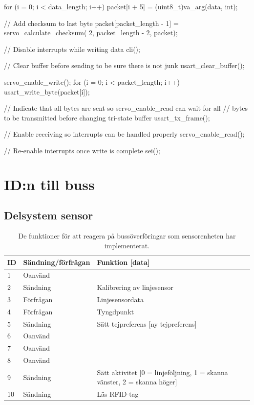 \begin{listing}{1}
{	for (i = 0; i < data_length; i++) {
		packet[i + 5] = (uint8_t)va_arg(data, int);
	}

	// Add checksum to last byte
	packet[packet_length - 1] = servo_calculate_checksum(
		2, packet_length - 2, packet);

	// Disable interrupts while writing data
	cli();

	// Clear buffer before sending to be sure there is not junk
	usart_clear_buffer();

	servo_enable_write();
	for (i = 0; i < packet_length; i++) {
		usart_write_byte(packet[i]);
	}

	// Indicate that all bytes are sent so servo_enable_read can
	wait for all
	// bytes to be transmitted before changing tri-state buffer
	usart_tx_frame();

	// Enable receiving so interrupts can be handled properly
	servo_enable_read();

	// Re-enable interrupts once write is complete
	sei();
}
\end{listing}

\section{ID:n till buss}
\label{sec:callbacks}
\subsection{Delsystem sensor}

\begin{table}[H]
\centering
\label{tab:callbacks-sensor}
\begin{tabularx}{\textwidth}{|l|l|X|}
\hline
\textbf{ID} & \textbf{Sändning/förfrågan} & \textbf{Funktion [data]} \\ \hline
1 & Oanvänd & \\ \hline
2 & Sändning & Kalibrering av linjesensor \\ \hline
3 & Förfrågan & Linjesensordata \\ \hline
4 & Förfrågan & Tyngdpunkt \\ \hline
5 & Sändning & Sätt tejpreferens [ny tejpreferens] \\ \hline
6 & Oanvänd & \\ \hline
7 & Oanvänd & \\ \hline
8 & Oanvänd & \\ \hline
9 & Sändning & Sätt aktivitet [0 = linjeföljning, 1 = skanna vänster, 2 = skanna höger] \\ \hline
10 & Sändning & Läs RFID-tag \\ \hline
\end{tabularx}
\caption{De funktioner för att reagera på bussöverföringar som sensorenheten har implementerat.}
\end{table}

